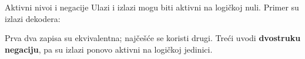 \begin{frame}[t,label=03-s011]{Aktivni nivoi i negacije}
\setlength{\parskip}{0pt}
Ulazi i izlazi mogu biti aktivni na logičkoj nuli. Primer su izlazi dekodera:
\par\vspace{.5mm}
{\centering\par}
\par\vspace{.5mm}
Prva dva zapisa su ekvivalentna; najčešće se koristi drugi. Treći uvodi
\textcolor{DEisticanje}{\textbf{dvostruku negaciju}}, pa su izlazi ponovo aktivni na logičkoj jedinici.
\par\vspace{1mm}
{\centering
{}
\par\vspace{.5mm}
\par}
\end{frame}
